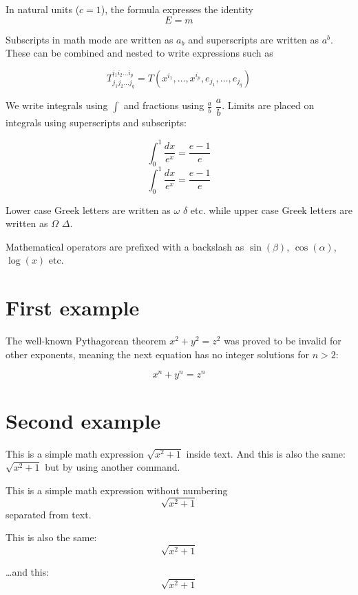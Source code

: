\documentclass[12pt, letterpaper]{article}
\begin{document}
In natural units ($c = 1$), the formula expresses the identity
\begin{equation}
E=m
\end{equation}

Subscripts in math mode are written as $a_b$ and superscripts are written as $a^b$. These can be combined and nested to write expressions such as

\[ T^{i_1 i_2 \dots i_p}_{j_1 j_2 \dots j_q} = T(x^{i_1},\dots,x^{i_p},e_{j_1},\dots,e_{j_q}) \]

We write integrals using $\int$ and fractions using $\frac{a}{b}$ $\dfrac{a}{b}$. Limits are placed on integrals using superscripts and subscripts:

\[ \int^1_0 \frac{dx}{e^x} =  \frac{e-1}{e} \]
\[ \int^1_0 \dfrac{dx}{e^x} =  \dfrac{e-1}{e} \]

Lower case Greek letters are written as $\omega$ $\delta$ etc. while upper case Greek letters are written as $\Omega$ $\Delta$.

Mathematical operators are prefixed with a backslash as $\sin(\beta)$, $\cos(\alpha)$, $\log(x)$ etc.

\section{First example}

The well-known Pythagorean theorem \(x^2 + y^2 = z^2\) was proved to be invalid for other exponents, meaning the next equation has no integer solutions for \(n>2\):

\[ x^n + y^n = z^n \]

\section{Second example}

This is a simple math expression \(\sqrt{x^2+1}\) inside text. 
And this is also the same: 
\begin{math}
\sqrt{x^2+1}
\end{math}
but by using another command.

This is a simple math expression without numbering
\[\sqrt{x^2+1}\] 
separated from text.

This is also the same:
\begin{displaymath}
\sqrt{x^2+1}
\end{displaymath}

\ldots and this:
\begin{equation*}
\sqrt{x^2+1}
\end{equation*}
\end{document}
